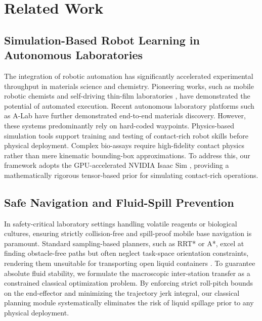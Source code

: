 \section{Related Work}
\label{sec:related_work}

\subsection{Simulation-Based Robot Learning in Autonomous Laboratories}
The integration of robotic automation has significantly accelerated experimental throughput in materials science and chemistry. Pioneering works, such as mobile robotic chemists \cite{burger2020mobile} and self-driving thin-film laboratories \cite{macleod2020self}, have demonstrated the potential of automated execution. Recent autonomous laboratory platforms such as A-Lab \cite{szymanski2022automated} have further demonstrated end-to-end materials discovery. However, these systems predominantly rely on hard-coded waypoints. Physics-based simulation tools support training and testing of contact-rich robot skills before physical deployment. Complex bio-assays require high-fidelity contact physics rather than mere kinematic bounding-box approximations. To address this, our framework adopts the GPU-accelerated NVIDIA Isaac Sim \cite{makoviychuk2021isaac}, providing a mathematically rigorous tensor-based prior for simulating contact-rich operations.

\subsection{Safe Navigation and Fluid-Spill Prevention}
In safety-critical laboratory settings handling volatile reagents or biological cultures, ensuring strictly collision-free and spill-proof mobile base navigation is paramount. Standard sampling-based planners, such as RRT* or A*, excel at finding obstacle-free paths but often neglect task-space orientation constraints, rendering them unsuitable for transporting open liquid containers \cite{gasparetto2015path}. To guarantee absolute fluid stability, we formulate the macroscopic inter-station transfer as a constrained classical optimization problem. By enforcing strict roll-pitch bounds on the end-effector and minimizing the trajectory jerk integral, our classical planning module systematically eliminates the risk of liquid spillage prior to any physical deployment.

